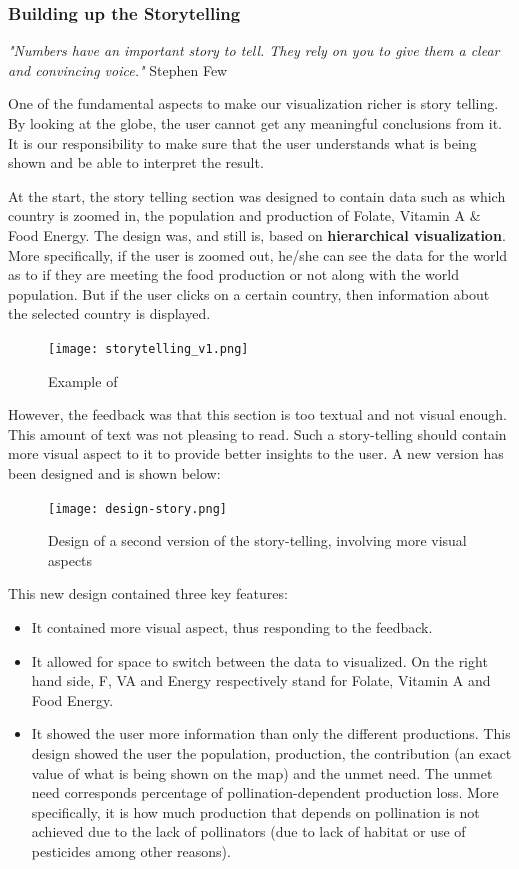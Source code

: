 \documentclass[12pt]{article}
\begin{document}
\subsubsection{Building up the Storytelling}
\textit{"Numbers have an important story to tell. They rely on you to give them a clear and convincing voice."} Stephen Few \newline

One of the fundamental aspects to make our visualization richer is story telling. By looking at the globe, the user cannot get any meaningful conclusions from it. It is our responsibility to make sure that the user understands what is being shown and be able to interpret the result. 

At the start, the story telling section was designed to contain data such as which country is zoomed in, the population and production of Folate, Vitamin A \& Food Energy. The design was, and still is, based on \textbf{hierarchical visualization}. More specifically, if the user is zoomed out, he/she can see the data for the world as to if they are meeting the food production or not along with the world population. But if the user clicks on a certain country, then information about the selected country is displayed.  \newline
\begin{figure}[h]
\centering
\texttt{[image: storytelling\_v1.png]}
\caption{Example of }
\end{figure} \newline
However, the feedback was that this section is too textual and not visual enough. This amount of text was not pleasing to read. Such a story-telling should contain more visual aspect to it to provide better insights to the user. 
A new version has been designed and is shown below:
\begin{figure}[h]
\centering
\texttt{[image: design-story.png]}
\caption{Design of a second version of the story-telling, involving more visual aspects}
\end{figure} \newline
This new design contained three key features: 
\begin{itemize}
    \item It contained more visual aspect, thus responding to the feedback.
    \item It allowed for space to switch between the data to visualized. On the right hand side, F, VA and Energy respectively stand for Folate, Vitamin A and Food Energy. 
    \item It showed the user more information than only the different productions. This design showed the user the population, production, the contribution (an exact value of what is being shown on the map) and the unmet need. The unmet need corresponds percentage of pollination-dependent production loss. More specifically, it is how much production that depends on pollination is not achieved due to the lack of pollinators (due to lack of habitat or use of pesticides among other reasons).
\end{itemize}
\end{document}
